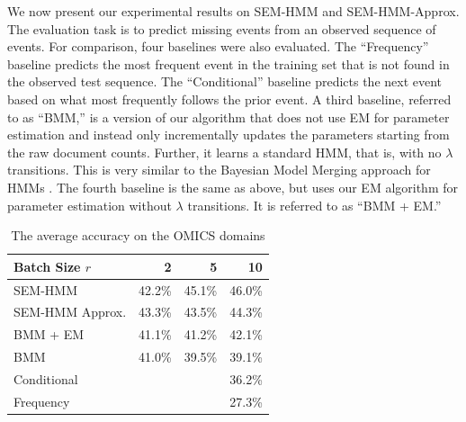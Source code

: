 \documentclass[letterpaper]{article}
\begin{document}
We now present our experimental results on SEM-HMM and SEM-HMM-Approx. The
evaluation task is to predict missing events from an observed sequence of events.
For comparison, four baselines were also evaluated.  The ``Frequency'' baseline predicts the most frequent event in the training set that is not found in the observed test sequence. The ``Conditional'' baseline predicts the next event based on what most frequently follows the prior event.  %
A third baseline, referred to as ``BMM,'' is a version of our algorithm that does not use EM for parameter estimation and instead only incrementally updates the parameters starting from the raw document counts. Further, it learns a standard HMM, that is, with no $\lambda$ transitions.
This is very similar to the Bayesian Model Merging approach for HMMs \cite{stolcke1994best}.
The fourth baseline is the same as above, but uses our EM algorithm for parameter estimation without $\lambda$ transitions. It is referred to as ``BMM + EM.''

\begin{table}
\footnotesize
\begin{center}
\begin{tabular}{|l|r|r|r|}
\hline
Batch Size $r$ & 2 & 5 & 10\\
\hline
SEM-HMM & 42.2\% & 45.1\% & 46.0\%\\
SEM-HMM Approx.& 43.3\% & 43.5\% & 44.3\%\\
BMM + EM & 41.1\% & 41.2\% & 42.1\%\\
BMM & 41.0\% & 39.5\% & 39.1\%\\
\hline
Conditional & \multicolumn{3}{r|}{36.2\%}\\
Frequency & \multicolumn{3}{r|}{27.3\%}\\
\hline
\end{tabular}
\caption{The average accuracy on the OMICS domains}
\end{center}
\label{table:omics}
\end{table}
\end{document}
